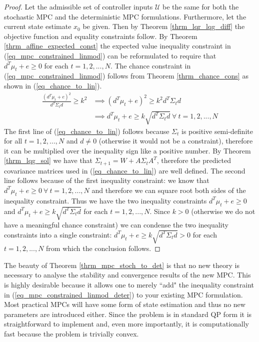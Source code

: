 \begin{proof}
Let the admissible set of controller inputs $\mathcal{U}$ be the same for both the stochastic MPC and the deterministic MPC formulations. Furthermore, let the current state estimate $x_0$ be given. Then by Theorem \ref{thrm_lqr_lqg_diff} the objective function and equality constraints follow. By Theorem \ref{thrm_affine_expected_const} the expected value inequality constraint in (\ref{eq_mpc_constrained_linmod}) can be reformulated to require that $d^T\mu_t + e \geq 0$ for each $t=1, 2,..., N$. The chance constraint in (\ref{eq_mpc_constrained_linmod}) follows from Theorem \ref{thrm_chance_cons} as shown in (\ref{eq_chance_to_lin}).
\begin{equation}
\begin{aligned}
\frac{(d^T\mu_t+e)^2}{d^T \Sigma_t d} \geq k^2 &\implies (d^T\mu_t+e)^2 \geq k^2 {d^T \Sigma_t d} \\
&\implies d^T\mu_t+e \geq k \sqrt{d^T \Sigma_t d}~\forall~t=1, 2,..., N
\end{aligned}
\label{eq_chance_to_lin}
\end{equation}
The first line of (\ref{eq_chance_to_lin}) follows because $\Sigma_t$ is positive semi-definite for all $t=1, 2,..., N$ and $d \neq 0$ (otherwise it would not be a constraint), therefore it can be multiplied over the inequality sign like a positive number. By Theorem \ref{thrm_lqg_sol} we have that $\Sigma_{t+1} = W + A\Sigma_tA^T$, therefore the predicted covariance matrices used in (\ref{eq_chance_to_lin}) are well defined. The second line follows because of the first inequality constraint: we know that $d^T\mu_t+e \geq 0 ~\forall~t=1,2,..., N$ and therefore we can square root both sides of the inequality constraint. Thus we have the two inequality constraints $d^T\mu_t+e \geq 0$ and $d^T\mu_t+e \geq k \sqrt{d^T \Sigma_t d}$ for each $t=1,2,...,N$. Since $k > 0$ (otherwise we do not have a meaningful chance constraint) we can condense the two inequality constraints into a single constraint: $d^T\mu_t+e \geq k \sqrt{d^T \Sigma_t d} > 0$ for each $t=1,2,...,N$ from which the conclusion follows.  
\end{proof}
The beauty of Theorem \ref{thrm_mpc_stoch_to_det} is that no new theory is necessary to analyse the stability and convergence results of the new MPC. This is highly desirable because it allows one to merely ``add" the inequality constraint in (\ref{eq_mpc_constrained_linmod_deter}) to your existing MPC formulation. Most practical MPCs will have some form of state estimation and thus no new parameters are introduced either. Since the problem is in standard QP form it is straightforward to implement and, even more importantly, it is computationally fast because the problem is trivially convex.

